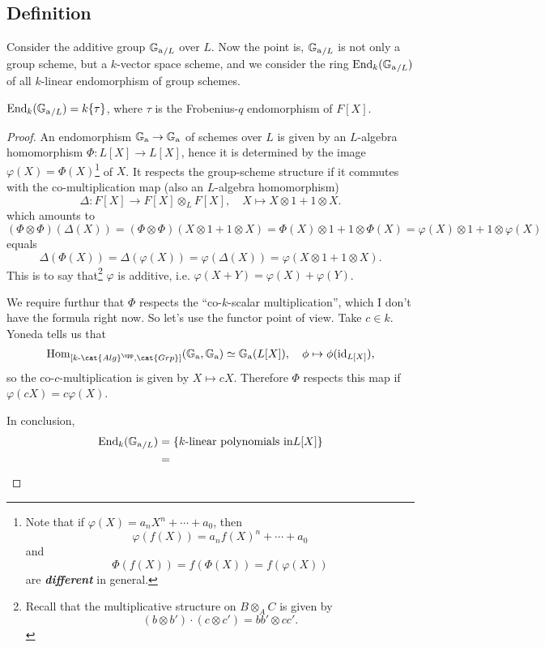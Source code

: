 \documentclass{article}
\begin{document}
\subsection{Definition}
Consider the additive group ${\mathbb{G}_{\mathrm{a}}}_{/L}$ over $L$.
Now the point is, ${\mathbb{G}_{\mathrm{a}}}_{/L}$ is not only a group scheme, but a $k$-vector space scheme,
and we consider the ring $\operatorname{End}_{k}({\mathbb{G}_{\mathrm{a}}}_{/L})$ of all $k$-linear endomorphism of group schemes.
\begin{proposition}
    $\operatorname{End}_{k}({\mathbb{G}_{\mathrm{a}}}_{/L}) = k\{\tau\}$, where $\tau$ is the Frobenius-$q$ endomorphism of $F[X]$.
\end{proposition}
\begin{proof}
    An endomorphism ${\mathbb{G}_{\mathrm{a}}}\to{\mathbb{G}_{\mathrm{a}}}$ of schemes over $L$ is given by an $L$-algebra homomorphism $\Phi: L[X]\to L[X]$,
    hence it is determined by the image $\varphi(X) = \Phi(X)$\footnote{
        Note that if $\varphi(X) = a_nX^n + \cdots + a_0$,
        then \[\varphi(f(X)) = a_nf(X)^n  + \cdots + a_0\] and
        \[\Phi(f(X)) = f(\Phi(X)) = f(\varphi(X))\] are \textit{\textbf{different}} in general.
    } of $X$.
    It respects the group-scheme structure if it commutes with the co-multiplication map (also an $L$-algebra homomorphism) \[\Delta : F[X]\to F[X]\otimes_L F[X],\quad X\mapsto X\otimes 1 + 1\otimes X.\]
    which amounts to\[(\Phi\otimes\Phi)(\Delta(X)) = (\Phi\otimes\Phi)(X\otimes 1 + 1\otimes X) =  \Phi(X)\otimes 1 + 1\otimes\Phi(X) = 
    \varphi(X)\otimes 1 + 1\otimes\varphi(X)\]
    equals \[\Delta(\Phi(X)) = \Delta(\varphi(X)) = \varphi(\Delta(X)) = \varphi(X\otimes 1 + 1\otimes X).\]
    This is to say that\footnote{
        Recall that the multiplicative structure on $B\otimes_A C$ is given by \[(b\otimes b')\cdot(c\otimes c') = bb'\otimes cc'.\]
    } $\varphi$ is additive, i.e. $\varphi(X+Y) = \varphi(X) + \varphi(Y)$.

    We require furthur that $\Phi$ respects the ``co-$k$-scalar multiplication'', which I don't have the formula right now.
    So let's use the functor point of view.
    Take $c\in k$.
    Yoneda tells us that
    \[\Hom_{[k\text{-}\cat{Alg}^\opp, \cat{Grp}]}(\Ga, \Ga) \simeq \Ga(L[X]), \quad \phi\mapsto \phi(\Id_{L[X]}),\]
    so the co-$c$-multiplication is given by $X\mapsto cX$.
    Therefore $\Phi$ respects this map if $\varphi(cX) = c\varphi(X)$.

    In conclusion,
    \begin{align*}
        \operatorname{End}_{k}({\mathbb{G}_{\mathrm{a}}}_{/L}) &= \{k\text{-linear polynomials in} L[X] \}\\
        &=
    \end{align*}




\end{proof}
\end{document}
